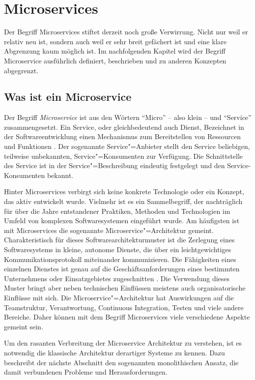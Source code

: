 \chapter{Microservices}

Der Begriff Microservices stiftet derzeit noch große Verwirrung. Nicht nur weil er relativ neu ist, sondern auch weil er sehr breit gefächert ist und eine klare Abgrenzung kaum möglich ist. Im nachfolgenden Kapitel wird der Begriff Microservice ausführlich definiert, beschrieben und zu anderen Konzepten abgegrenzt.

\section{Was ist ein Microservice}

Der Begriff \textit{Microservice} ist aus den Wörtern "`Micro"' -- also klein -- und "`Service"' zusammengesetzt. Ein Service, oder gleichbedeutend auch Dienst,  Bezeichnet in der Softwareentwicklung einen Mechanismus zum Bereitstellen von Ressourcen und Funktionen \cite[12]{Brown06referencemodel}. Der sogenannte Service"=Anbieter stellt den Service beliebigen, teilweise unbekannten, Service"=Konsumenten zur Verfügung. Die Schnittstelle des Service ist in der Service"=Beschreibung eindeutig festgelegt und den Service-Konsumenten bekannt.

Hinter Microservices verbirgt sich keine konkrete Technologie oder ein Konzept, das aktiv entwickelt wurde. Vielmehr ist es ein Sammelbegriff, der nachträglich für über die Jahre entstandener Praktiken, Methoden und Technologien im Umfeld von komplexen Softwaresystemen eingeführt wurde. Am häufigsten ist mit Microservices die sogenannte Microservice"=Architektur gemeint. Charakteristisch für dieses Softwarearchitekturmuster ist die Zerlegung eines Softwaresystems in kleine, autonome Dienste, die über ein leichtgewichtiges Kommunikationsprotokoll miteinander kommunizieren. Die Fähigkeiten eines einzelnen Dienstes ist genau auf die Geschäftsanforderungen eines bestimmten Unternehmens oder Einsatzgebietes zugeschnitten \cite{FowlerMS}. Die Verwendung dieses Muster bringt aber neben technischen Einflüssen meistens auch organisatorische Einflüsse mit sich. Die Microservice"=Architektur hat Auswirkungen auf die Teamstruktur, Verantwortung, Continuous Integration, Testen und viele andere Bereiche. Daher können mit dem Begriff Microservices viele verschiedene Aspekte gemeint sein.

Um den rasanten Verbreitung der Microservice Architektur zu verstehen, ist es notwendig die klassische Architektur derartiger Systeme zu kennen. Dazu beschreibt der nächste Abschnitt den sogenannten monolithischen Ansatz, die damit verbundenen Probleme und Herausforderungen.

